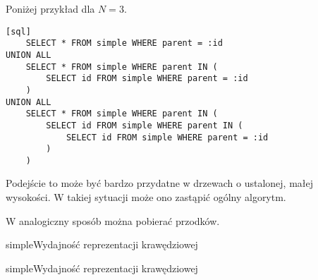 Poniżej przykład dla $N = 3$.

\begin{verbatim}[sql]
    SELECT * FROM simple WHERE parent = :id
UNION ALL 
    SELECT * FROM simple WHERE parent IN (
        SELECT id FROM simple WHERE parent = :id
    )
UNION ALL
    SELECT * FROM simple WHERE parent IN (
        SELECT id FROM simple WHERE parent IN (
            SELECT id FROM simple WHERE parent = :id
        )
    )
\end{verbatim}

Podejście to może być bardzo przydatne w drzewach o ustalonej, małej wysokości.
W takiej sytuacji może ono zastąpić ogólny algorytm.

W analogiczny sposób można pobierać przodków.








%
%


\begin{qxtab}{simple}{Wydajność reprezentacji krawędziowej}
\end{qxtab}

\begin{qxfig}{simple}{Wydajność reprezentacji krawędziowej}
\end{qxfig}

